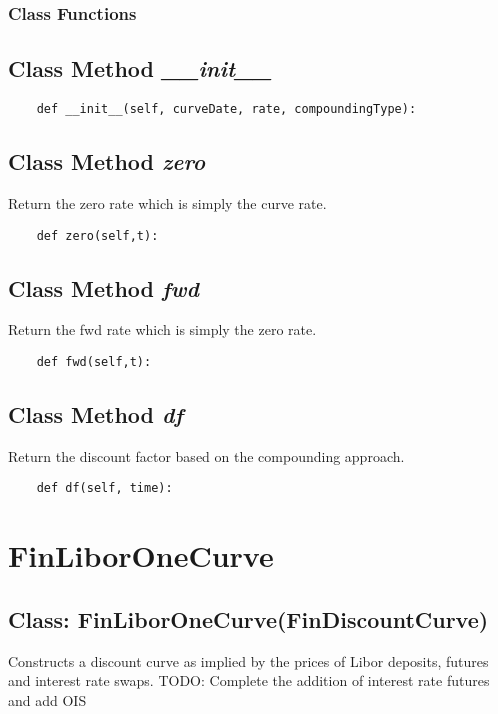 \documentclass[twoside,11pt]{book}
\begin{document}
\subsubsection{Class Functions}

\subsection{Class Method {\it \_\_init\_\_}}


\begin{lstlisting}
    def __init__(self, curveDate, rate, compoundingType):
\end{lstlisting}

\subsection{Class Method {\it zero}}
Return the zero rate which is simply the curve rate. 

\begin{lstlisting}
    def zero(self,t):
\end{lstlisting}

\subsection{Class Method {\it fwd}}
Return the fwd rate which is simply the zero rate. 

\begin{lstlisting}
    def fwd(self,t):
\end{lstlisting}

\subsection{Class Method {\it df}}
Return the discount factor based on the compounding approach. 

\begin{lstlisting}
    def df(self, time):
\end{lstlisting}

\newpage
\section{FinLiborOneCurve}

\subsection{Class: FinLiborOneCurve(FinDiscountCurve)}
Constructs a discount curve as implied by the prices of Libor deposits, futures and interest rate swaps. TODO: Complete the addition of interest rate futures and add OIS 
\end{document}
